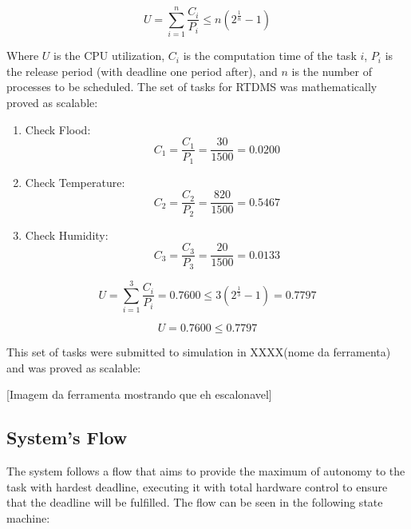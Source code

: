 \documentclass[12pt]{article}
\begin{document}
\[ \displaystyle U = \sum_{i=1}^{n}\frac{C_i}{P_i} \leq n(2^\frac{1}{n} - 1) \]

Where \(U\) is the CPU utilization, \(C_i\) is the computation time of the task \(i\), \(P_i\) is the release period (with deadline one period after),
and \(n\) is the number of processes to be scheduled. The set of tasks for RTDMS was mathematically proved as scalable:

\begin{enumerate}
 \item Check Flood: \[ C_1 = \frac{C_1}{P_1} = \frac{30}{1500} = 0.0200 \]
 \item Check Temperature: \[ C_2 = \frac{C_2}{P_2} = \frac{820}{1500} = 0.5467 \]
 \item Check Humidity: \[ C_3 = \frac{C_3}{P_3} = \frac{20}{1500} = 0.0133 \]
\end{enumerate}

\[ U = \sum_{i=1}^{3}\frac{C_i}{P_i} = 0.7600 \leq 3(2^\frac{1}{3} - 1) = 0.7797 \]

\[ U = 0.7600 \leq 0.7797 \]

This set of tasks were submitted to simulation in XXXX(nome da ferramenta) and was proved as scalable:

[Imagem da ferramenta mostrando que eh escalonavel]

\subsection{System's Flow}
The system follows a flow that aims to provide the maximum of autonomy to the task with hardest deadline, executing
it with total hardware control to ensure that the deadline will be fulfilled. The flow can be seen in the following
state machine:
\end{document}
